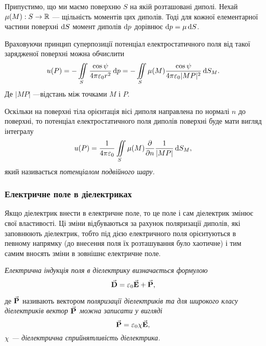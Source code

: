 Припустимо, що ми маємо поверхню $S$ на якій розташовані диполі. Нехай $\mu(M): S \to \mathbb{R}$ --- щільність моментів цих диполів. Тоді для кожної елементарної частини поверхні $\mathop{}\!\mathrm{d} S$ момент диполів $\mathop{}\!\mathrm{d} p$ дорівнює $\mathop{}\!\mathrm{d} p = \mu \mathop{}\!\mathrm{d} S$. \medskip

Враховуючи принцип суперпозиції потенціал електростатичного поля від такої зарядженої поверхні можна обчислити
\begin{equation}
	u(P) = -\displaystyle\iint\limits_S \frac{\cos\psi}{4\pi\varepsilon_0 r^2} \mathop{}\!\mathrm{d} p = - \displaystyle\iint\limits_S \mu(M) \frac{\cos\psi}{4\pi\varepsilon_0 |MP|^2} \mathop{}\!\mathrm{d} S_M.
\end{equation}
Де $|MP|$ ---відстань між точками $M$ і $P$. 

\begin{definition}
	Оскільки на поверхні тіла орієнтація вісі диполя направлена по нормалі $n$ до поверхні, то потенціал електростатичного поля диполів поверхні буде мати вигляд інтегралу
	\begin{equation}
		u(P) = \frac{1}{4 \pi \varepsilon_0} \displaystyle\iint\limits_S \mu(M) \frac{\partial}{\partial n} \frac{1}{|MP|} \mathop{}\!\mathrm{d} S_M,
	\end{equation}
	який називається \it{потенціалом подвійного шару}.
\end{definition}

\subsubsection{Електричне поле в діелектриках}

Якщо діелектрик внести в електричне поле, то це поле і сам діелектрик змінює свої властивості. Ці зміни відбуваються за рахунок поляризації диполів, які заповнюють діелектрик, тобто під дією електричного поля орієнтуються в певному напрямку (до внесення поля їх розташування було хаотичне) і тим самим вносять зміни в зовнішнє електричне поле. 

\begin{definition}
	\it{Електрична індукція} поля в діелектрику визначається формулою 
	\begin{equation}
		{\vec{\mathbf{D}}} = \varepsilon_0 {\vec{\mathbf{E}}} + {\vec{\mathbf{P}}},
	\end{equation}
\end{definition}
де 	${\vec{\mathbf{P}}}$ називають вектором \it{поляризації діелектриків} та для широкого класу діелектриків вектор ${\vec{\mathbf{P}}}$ можна записати у вигляді
\begin{equation}
	{\vec{\mathbf{P}}} = \varepsilon_0 \chi {\vec{\mathbf{E}}},
\end{equation}
	$\chi$ --- діелектрична сприйнятливість діелектрика. 


